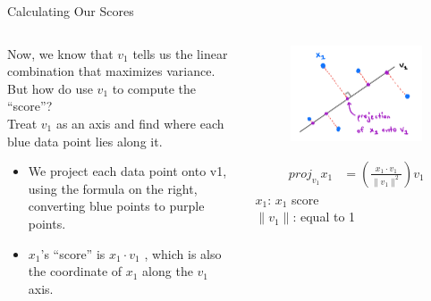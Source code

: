 \documentclass[aspectratio=169]{../latex_main/tntbeamer}  %
\begin{document}
	
	
	\begin{frame}{Calculating Our Scores}
	    \begin{columns}
	        \begin{column}{.5\textwidth}
	               Now, we know that $v_1$ tells us the linear combination that maximizes variance. But how do use $v_1$ to compute the “score”?\\
	               \bigskip
	               Treat $v_1$ as an axis and find where each blue data point lies along it.
	               \begin{itemize}
	                   \item We project each data point onto v1, using the formula on the right, converting blue points to purple points.
	                   \item $x_1$’s “score” is	$x_1\cdot v_1$		, which is also the coordinate of $x_1$ along the $v_1$ axis.
	               \end{itemize}


	        \end{column}
	        
	        
	        \begin{column}{.5\textwidth}
	                \begin{figure}
	                    \centering
	                    \includegraphics[scale=.4]{Bild9}
	                \end{figure}
	                \begin{align*}
	                    proj_v_1 x_1 &= \left(\frac{x_1\cdot v_1}{\| v_1 \| ^2}\right)v_1
	                \end{align*}
	                $x_1$: $x_1$ score\\
	                $\| v_1 \|$: equal to 1
	        \end{column}
	    \end{columns}
	\end{frame}
	
\end{document}
